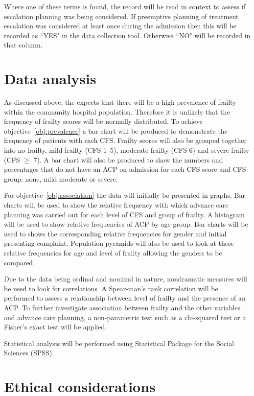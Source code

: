 \documentclass
[
	12pt,
	a4paper,
	oneside,
]{article}
\begin{document}
Where one of these terms is found, the record will be read in context to assess if 
escalation planning was being considered. If preemptive planning of treatment escalation
was considered at least once during the admission then this will be recorded as ``YES"
in the data collection tool. Otherwise ``NO" will be recorded in that column.

\section{Data analysis}
As discussed above, the expects that there will be a high prevalence of frailty 
within the community hospital population. Therefore it is unlikely that the frequency
of frailty scores will be normally distributed. To achieve objective~\ref{obj:prevalence}
a bar chart will be produced to demonstrate the frequency of patients with each CFS.
Frailty scores will also be grouped together into no frailty, mild frailty (CFS 1--5),
moderate frailty (CFS 6) and severe frailty (CFS $\geq$ 7). A bar chart will also 
be produced to show the numbers and percentages that do not have an ACP on admission
for each CFS score and CFS group: none, mild moderate or severe.

For objective~\ref{obj:association} the data will initially be presented in graphs.
Bar charts will be used to show the relative frequency with which advance care planning
was carried out for each level of CFS and group of frailty. A histogram will be 
used to show relative frequencies of ACP by age group. Bar charts 
will be used to shows the corresponding relative frequencies for gender and initial
presenting complaint. Population pyramids will also be used to look at these relative
frequencies for age and level of frailty allowing the genders to be compared.

Due to the data being ordinal and nominal in nature, nondramatic measures will
be used to look for correlations. A Spear-man's rank correlation will be performed
to assess a relationship between level of frailty and the presence of an ACP. To 
further investigate association between frailty and the other variables and advance
care planning, a non-parametric test such as a chi-squared test or a Fisher's exact
test will be applied.

Statistical analysis will be performed using Statistical Package for the Social 
Sciences (SPSS).

\section{Ethical considerations}
\end{document}

